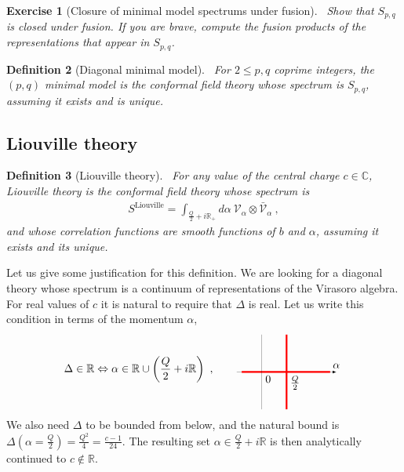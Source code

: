 \documentclass[12pt, a4paper]{article}
\theoremstyle{break}
\newtheorem{exo}{Exercise}[section]
\newtheorem{defn}[exo]{Definition}
\begin{document}
\begin{exo}[Closure of minimal model spectrums under fusion]
 ~\label{exo:cmm}
 Show that $S_{p,q}$ is closed under fusion. If you are brave, compute the fusion products of the representations that appear in $S_{p,q}$.
\end{exo}

\begin{defn}[Diagonal minimal model]
 ~\label{def:dmm}
 For $2\leq p,q$ coprime integers, the $(p,q)$ minimal model is the conformal field theory whose spectrum is $S_{p, q}$, assuming it exists and is unique.
\end{defn}


\subsection{Liouville theory}

\begin{defn}[Liouville theory]
 ~\label{def:liou}
 For any value of the central charge $c\in\mathbb{C}$, Liouville theory is the conformal field theory whose spectrum is 
 \begin{align}
  S^\mathrm{Liouville} 
= \int_{\frac{Q}{2}+i\mathbb{R}_+}  d\alpha\ \mathcal V_\alpha \otimes 
   \bar{\mathcal V}_\alpha\ , 
 \end{align}
and whose correlation functions are smooth functions of $b$ and $\alpha$, assuming it exists and its unique.
\end{defn}
Let us give some justification for this definition. We are looking for a diagonal theory whose spectrum is a continuum of representations of the Virasoro algebra. For real values of $c$ it is natural to require that $\Delta$ is real. Let us write this condition in terms of the momentum $\alpha$,
\begin{align}
 \Delta \in \mathbb{R} \Leftrightarrow \alpha\in \mathbb{R} \cup \left(\frac{Q}{2} + i\mathbb{R}\right)\ ,
  \qquad
   \begin{tikzpicture}[scale = .4, baseline=(current  bounding  box.center)]
  \draw[-latex, very thin] (-2, 0) -- (0, 0) node[below right] {$0$} -- (2, 0) node[below right] {$\frac{Q}{2}$} -- (4, 0)  -- (6, 0) node[above] {$\alpha$};
  \draw[red, ultra thick] (-1.6, 0) -- (5.5, 0);
  \draw[red, ultra thick] (2, -3) -- (2, 3);
  \draw[very thin] (0, -3) -- (0, 3);
 \end{tikzpicture}
\end{align}
We also need $\Delta$ to be bounded from below, and the natural bound is $\Delta(\alpha=\frac{Q}{2}) = \frac{Q^2}{4}=\frac{c-1}{24}$. The resulting set $\alpha \in \frac{Q}{2}+i\mathbb{R}$ is then analytically continued to $c\notin \mathbb{R}$.
\end{document}
